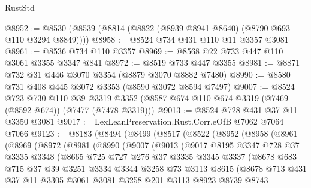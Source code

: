 \begin{lexlean}{RustStd}
\begin{coremodule}
@8952 := @8530 (@8539 (@8814 (@8822 (@8939 @8941 @8640) (@8790 @693 @110 @3294 @8849))))
@8958 := @8524 @734 @431 @110 @11 @3357 @3081
@8961 := @8536 @734 @110 @3357
@8969 := @8568 @22 @733 @447 @110 @3061 @3355 @3347 @841
@8972 := @8519 @733 @447 @3355
@8981 := @8871 @732 @31 @446 @3070 @3354 (@8879 @3070 @8882 @7480)
@8990 := @8580 @731 @408 @445 @3072 @3353 (@8590 @3072 @8594 @7497)
@9007 := @8524
    @723
    @730
    @110
    @39
    @3319
    @3352
    (@8587 @674 @110 @674 @3319 (@7469 (@8592 @674)) (@7477 (@7478 @3319)))
@9013 := @8524 @728 @431 @37 @11 @3350 @3081
@9017 := LexLeanPreservation.Rust.Corr.eOfB @7062 @7064 @7066
@9123 := @8183
    (@8494
      (@8499
        (@8517
          (@8522
            (@8952
              (@8958
                (@8961
                  (@8969
                    (@8972
                      (@8981
                        (@8990
                          (@9007
                            (@9013
                              (@9017
                                @8195
                                @3347
                                @728
                                @37
                                @3335
                                @3348
                                (@8665
                                  @725
                                  @727
                                  @276
                                  @37
                                  @3335
                                  @3345
                                  @3337
                                  (@8678
                                    @683
                                    @715
                                    @37
                                    @39
                                    @3251
                                    @3334
                                    @3344
                                    @3258
                                    @73
                                    @3113
                                    @8615
                                    (@8678
                                      @713
                                      @431
                                      @37
                                      @11
                                      @3305
                                      @3061
                                      @3081
                                      @3258
                                      @201
                                      @3113
                                      @8923
                                      @8739
                                      @8743

\end{coremodule}
\end{lexlean}
